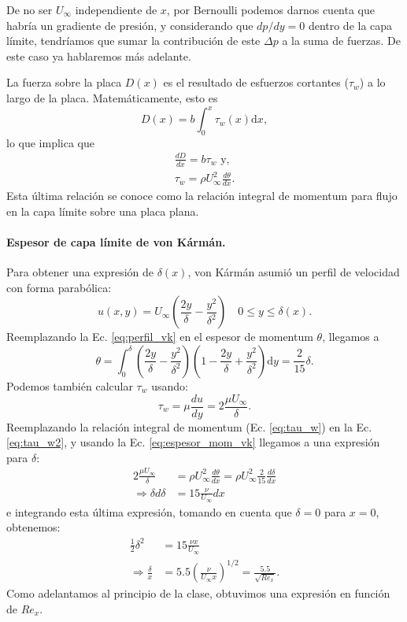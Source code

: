 De no ser $U_\infty$  independiente de $x$, por Bernoulli podemos darnos cuenta que habría un gradiente de presión, y considerando que $dp/dy=0$ dentro de la capa límite, tendríamos que sumar la contribución de este $\Delta p$ a la suma de fuerzas.
De este caso ya hablaremos más adelante.

La fuerza sobre la placa $D(x)$ es el resultado de esfuerzos cortantes ($\tau_w$) a lo largo de la placa.
Matemáticamente, esto es
%
\begin{equation}
D(x) = b\int_0^x \tau_w(x)\mathrm{d}x,
\end{equation}
%
lo que implica que
%
\begin{align}\label{eq:tau_w}
\frac{dD}{dx}=b\tau_w \text{ y, }\nonumber\\
\tau_w=\rho U_\infty^2 \frac{d\theta}{dx}.
\end{align}
%
Esta última relación se conoce como la relación integral de momentum para flujo en la capa límite sobre una placa plana.

\paragraph*{Espesor de capa límite de von Kármán.}
Para obtener una expresión de $\delta(x)$, von Kármán asumió un perfil de velocidad con forma parabólica:
%
\begin{equation}\label{eq:perfil_vk}
u(x,y) = U_\infty\left(\frac{2y}{\delta}-\frac{y^2}{\delta^2}\right) \quad 0\leq y\leq \delta(x).
\end{equation}
%
Reemplazando la Ec. \eqref{eq:perfil_vk} en el espesor de momentum $\theta$, llegamos a
%
\begin{equation}\label{eq:espesor_mom_vk}
\theta = \int_0^\delta \left(\frac{2y}{\delta} - \frac{y^2}{\delta^2}\right)\left(1-\frac{2y}{\delta} + \frac{y^2}{\delta^2}\right)\mathrm{d}y=\frac{2}{15}\delta.
\end{equation}
%
Podemos también calcular $\tau_w$ usando:
%
\begin{equation}\label{eq:tau_w2}
\tau_w = \mu\frac{du}{dy} = 2\frac{\mu U_\infty}{\delta}.
\end{equation}
%
Reemplazando la relación integral de momentum (Ec. \eqref{eq:tau_w}) en la Ec. \eqref{eq:tau_w2}, y usando la Ec. \eqref{eq:espesor_mom_vk} llegamos a una expresión para $\delta$:
%
\begin{align}
2\frac{\mu U_\infty}{\delta} &= \rho U_\infty^2 \frac{d\theta}{dx} = \rho U_\infty^2 \frac{2}{15}\frac{d\delta}{dx}\nonumber\\
\Rightarrow \delta d\delta &= 15\frac{\nu}{U_\infty}dx
\end{align}
% 
e integrando esta última expresión, tomando en cuenta que $\delta=0$ para $x=0$, obtenemos:
%
\begin{align}
\frac{1}{2}\delta^2 &= 15 \frac{\nu x}{U_\infty} \nonumber\\
\Rightarrow \frac{\delta}{x} &= 5.5\left(\frac{\nu}{U_\infty x}\right)^{1/2} = \frac{5.5}{\sqrt{Re_x}}.
\end{align}
%
Como adelantamos al principio de la clase, obtuvimos una expresión en función de $Re_x$.

